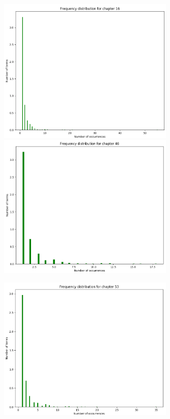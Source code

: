 \documentclass{article}
\begin{document}
\begin{flushleft}
\begin{figure}[H]
\begin{minipage}{0.45\linewidth}
			\includegraphics[width=0.75\textwidth]{./images/4-chapter_wise-frequency.png}
			\includegraphics[width=0.75\textwidth]{./images/5-chapter_wise-frequency.png}
		\end{minipage}
		\hfill
		\begin{minipage}{0.45\linewidth}
			\centering
			\includegraphics[width=0.75\textwidth]{./images/6-chapter_wise-frequency.png}

\end{minipage}
\end{figure}
\end{flushleft}
\end{document}
